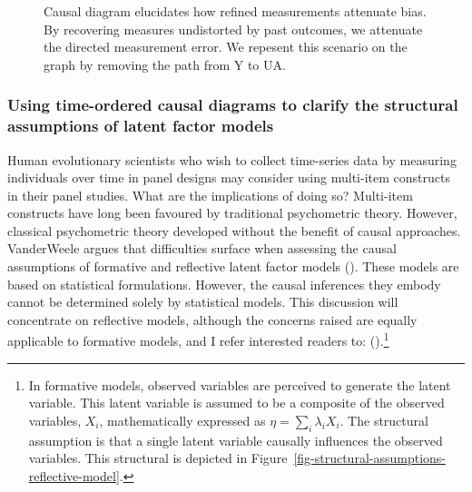 \documentclass[
  singlecolumn,
  9pt]{article}
\begin{document}
\begin{figure}


\caption{\label{fig-dag-measure-selection}Causal diagram elucidates how
refined measurements attenuate bias. By recovering measures undistorted
by past outcomes, we attenuate the directed measurement error. We
repesent this scenario on the graph by removing the path from Y to UA.}

\end{figure}%

\subsubsection{Using time-ordered causal diagrams to clarify the
structural assumptions of latent factor
models}\label{using-time-ordered-causal-diagrams-to-clarify-the-structural-assumptions-of-latent-factor-models}

Human evolutionary scientists who wish to collect time-series data by
measuring individuals over time in panel designs may consider using
multi-item constructs in their panel studies. What are the implications
of doing so? Multi-item constructs have long been favoured by
traditional psychometric theory. However, classical psychometric theory
developed without the benefit of causal approaches. VanderWeele argues
that difficulties surface when assessing the causal assumptions of
formative and reflective latent factor models
(). These models are
based on statistical formulations. However, the causal inferences they
embody cannot be determined solely by statistical models. This
discussion will concentrate on reflective models, although the concerns
raised are equally applicable to formative models, and I refer
interested readers to: ().\footnote{In formative models, observed variables are perceived
  to generate the latent variable. This latent variable is assumed to be
  a composite of the observed variables, \(X_i\), mathematically
  expressed as \(\eta = \sum_i\lambda_i X_i\). The structural assumption
  is that a single latent variable causally influences the observed
  variables. This structural is depicted in
  Figure~\ref{fig-structural-assumptions-reflective-model}.}
\end{document}
